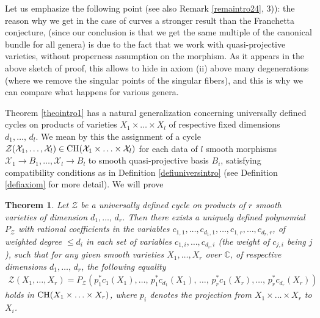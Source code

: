 \documentclass[10pt]{article}
\newtheorem{theo}{Theorem}[section]
\begin{document}
Let us emphasize the following point (see also Remark \ref{remaintro24}, 3)): the reason why we get in the case of curves
a stronger result than the Franchetta conjecture, (since our conclusion is that
we get the same multiple of the canonical bundle for all genera)  is due to the fact that
we work with quasi-projective varieties, without properness assumption
on the morphism.
As it appears in the above sketch of proof, this allows to hide in axiom (ii) above many degenerations (where we remove the singular
points of the singular fibers), and this is why we can compare what happens for various genera.

 Theorem  \ref{theointro1} has a natural generalization
   concerning universally defined cycles  on products of varieties $X_1\times\ldots\times X_l$ of respective fixed dimensions $d_1,\ldots,\,d_l$.
 We mean by this the assignment of a cycle
 $\mathcal{Z}(\mathcal{X}_1,\ldots,\mathcal{X}_l)\in{\rm CH}(\mathcal{X}_1\times \ldots\times \mathcal{X}_l)$
 for each data of $l$ smooth morphisms $\mathcal{X}_1\rightarrow B_1,\ldots, \mathcal{X}_l\rightarrow B_l$ to smooth quasi-projective basis $B_i$, satisfying compatibility conditions as in Definition \ref{defiuniversintro} (see Definition \ref{defiaxiom} for more detail).
 We will prove
 \begin{theo}\label{theosansdiag} Let $\mathcal{Z}$ be a universally defined cycle on products of $r$
smooth varieties of dimension $d_1,\ldots,\,d_r$. Then there exists a uniquely defined polynomial $P_{\mathcal{Z}}$ with rational coefficients in the variables $c_{1,1},\ldots, c_{d_1,1},\ldots,c_{1,r},\ldots, c_{d_r,r}$, of weighted degree $\leq d_i$ in each set of variables $c_{1,i},\ldots, c_{d_i,i}$ (the weight of
$c_{j,i}$ being $j$), such that
for any  given  smooth varieties $X_1,\ldots,X_r$ over $\mathbb{C}$, of respective dimensions
$d_1,\ldots,\,d_r$, the following equality
\begin{eqnarray}\label{eqpourcyclepol}
\mathcal{Z}(X_1,\ldots,X_r)=P_{\mathcal{Z}}(p_1^*c_1(X_1),\ldots,\,p_1^*c_{d_1}(X_1),\,\ldots,\,
p_r^*c_1(X_r),\ldots,\,p_r^*c_{d_r}(X_r))
\end{eqnarray}
holds in ${\rm CH}(X_1\times\ldots\times X_r)$,
where  $p_i$ denotes the projection from $X_1\times\ldots\times X_r$ to $X_i$.
\end{theo}
\end{document}
